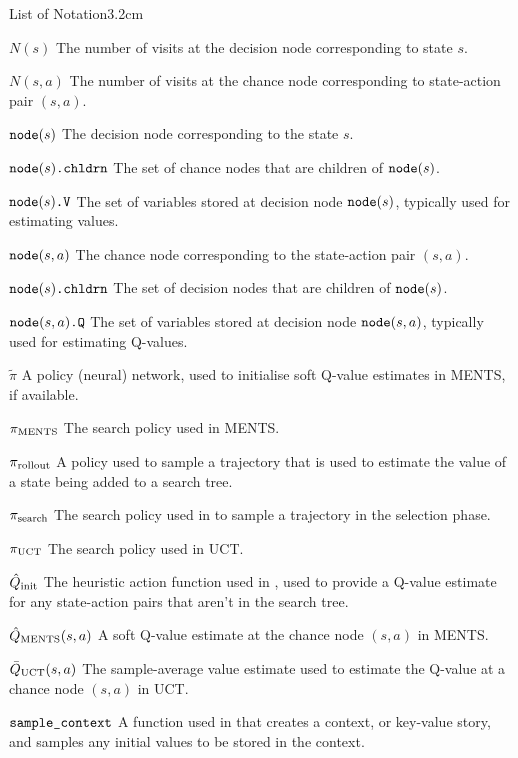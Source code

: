 \begin{mclistof}{List of Notation}{3.2cm}
    \item[$N(s)$]
        The number of visits at the decision node corresponding to state $s$.
    \item[$N(s,a)$]
        The number of visits at the chance node corresponding to state-action pair $(s,a)$.
    \item[${\textnormal{\texttt{node}}}(s)$] 
        The decision node corresponding to the state $s$.
    \item[${\textnormal{\texttt{node}}}(s){\textnormal{\texttt{.chldrn}}}$]
        The set of chance nodes that are children of ${\textnormal{\texttt{node}}}(s)$.
    \item[${{\textnormal{\texttt{node}}}(s)\textnormal{\texttt{.V}}}$]
        The set of variables stored at decision node ${\textnormal{\texttt{node}}}(s)$, typically used for estimating values.
    \item[${\textnormal{\texttt{node}}}(s,a)$] 
        The chance node corresponding to the state-action pair $(s,a)$.
    \item[${\textnormal{\texttt{node}}}(s){\textnormal{\texttt{.chldrn}}}$]
        The set of decision nodes that are children of ${\textnormal{\texttt{node}}}(s)$.
    \item[${{\textnormal{\texttt{node}}}(s,a)\textnormal{\texttt{.Q}}}$] 
        The set of variables stored at decision node ${\textnormal{\texttt{node}}}(s,a)$, typically used for estimating Q-values.
    \item[$\tilde{\pi}$] 
        A policy (neural) network, used to initialise soft Q-value estimates in MENTS, if available. 
    \item[${\pi_{{\textnormal{MENTS}}}}$] 
        The search policy used in MENTS.
    \item[${\pi_{{\textnormal{rollout}}}}$] 
        A policy used to sample a trajectory that is used to estimate the value of a state being added to a search tree.
    \item[${\pi_{\textnormal{search}}}$]
        The search policy used in \thtspp\ewe to sample a trajectory in the selection phase.
    \item[${\pi_{{\textnormal{UCT}}}}$] 
        The search policy used in UCT.
    \item[${\hat{Q}_{\textnormal{init}}}$]
        The heuristic action function used in \thtspp, used to provide a Q-value estimate for any state-action pairs that aren't in the search tree.
    \item[${\hat{Q}_{{\textnormal{MENTS}}}}(s,a)$] 
        A soft Q-value estimate at the chance node $(s,a)$ in MENTS.
    \item[${\bar{Q}_{{\textnormal{UCT}}}}(s,a)$] 
        The sample-average value estimate used to estimate the Q-value at a chance node $(s,a)$ in UCT.   
    \item[${\textnormal{\texttt{sample\_context}}}$]
        A function used in \thtspp\ewe that creates a context, or key-value story, and samples any initial values to be stored in the context.

\end{mclistof}
